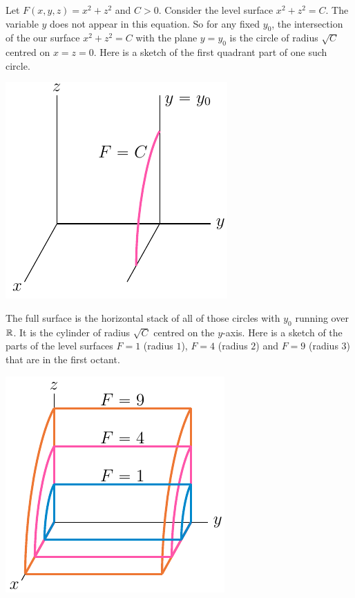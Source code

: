 \bigskip\goodbreak
\begin{eg}[$F(x,y,z)=x^2+z^2$]\label{eg level surface cylinder}
Let $F(x,y,z)=x^2+z^2$ and $C>0$. Consider the level surface
$x^2+z^2=C$.  The variable $y$ does not appear in this equation. 
So for any fixed $y_0$, the intersection of the our surface
$x^2+z^2=C$ with the plane $y=y_0$ is the circle of radius $\sqrt{C}$
centred on $x=z=0$. Here is a sketch of the first quadrant part of
one such circle.
\begin{efig}
\begin{center}
   \includegraphics{cylB.pdf}
\end{center}
\end{efig}
The full surface is the horizontal stack of all of those
circles with $y_0$ running over $\mathbb{R}$. It is the cylinder of radius  
$\sqrt{C}$ centred on the $y$-axis.
Here is a sketch of the parts of the level surfaces 
           $F=1$ (radius $1$), 
           $F=4$ (radius $2$) and 
           $F=9$ (radius $3$)
that are in the first octant.
\begin{efig}
\begin{center}
   \includegraphics{cylA.pdf}
\end{center}
\end{efig}
\end{eg}

